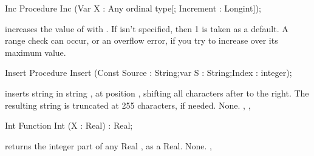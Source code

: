 \documentclass{report}
\begin{document}
\html{}
\begin{procedure}{Inc}
\Declaration
Procedure Inc (Var X : Any ordinal type[; Increment : Longint]);

\Description
{} increases the value of  with .
If  isn't specified, then 1 is taken as a default.
\Errors
A range check can occur, or an overflow error, if you try to increase 
over its maximum value.
\SeeAlso
{}
\end{procedure}
\html{}
\begin{procedure}{Insert}
\Declaration
Procedure Insert (Const Source : String;var S : String;Index : integer);

\Description
{} inserts string  in string , at position
, shifting all characters after  to the right. The
resulting string is truncated at 255 characters, if needed.
\Errors
None.
\SeeAlso
{}, , 
\end{procedure}
\html{}
\begin{function}{Int}
\Declaration
Function Int (X : Real) : Real;

\Description
{} returns the integer part of any Real , as a Real.
\Errors
None.
\SeeAlso
{}, 
\end{function}
\html{}
\end{document}
